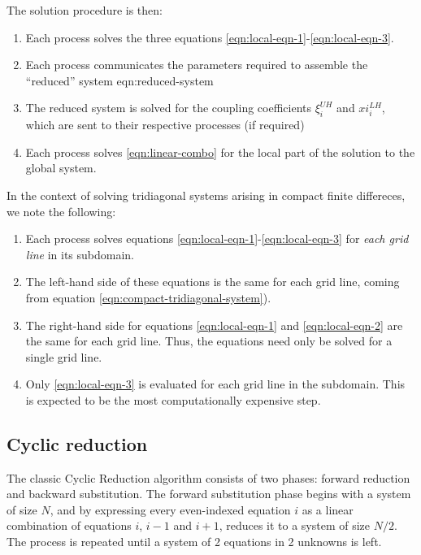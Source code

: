 \documentclass{article}
\begin{document}
    The solution procedure is then:

    \begin{enumerate}
        \item Each process solves the three equations
        \ref{eqn:local-eqn-1}-\ref{eqn:local-eqn-3}.
        \item Each process communicates the parameters required to
        assemble the ``reduced'' system eqn:reduced-system
        \item The reduced system is solved for the coupling coefficients
        $\xi_i^{UH}$ and $xi_i^{LH}$, which are sent to their respective processes
        (if required)
        \item Each process solves \ref{eqn:linear-combo} for the local part
        of the solution to the global system.
    \end{enumerate}

    In the context of solving tridiagonal systems arising in compact finite differeces,
    we note the following:

    \begin{enumerate}
        \item Each process solves equations \ref{eqn:local-eqn-1}-\ref{eqn:local-eqn-3}
            for \emph{each grid line} in its subdomain.
        \item The left-hand side of these equations is the same
            for each grid line, coming from equation \ref{eqn:compact-tridiagonal-system}).
        \item The right-hand side for equations \ref{eqn:local-eqn-1} and
            \ref{eqn:local-eqn-2} are the same for each grid line.
            Thus, the equations need only be solved for a single grid line.
        \item Only \ref{eqn:local-eqn-3} is evaluated for each grid line
            in the subdomain. This is expected to be the most computationally expensive step.
    \end{enumerate}

    \subsection{Cyclic reduction}

        The classic Cyclic Reduction algorithm consists of two phases:
        forward reduction and backward substitution.
        The forward substitution phase begins with a system of size $N$,
        and by expressing every even-indexed equation $i$ as a linear
        combination of equations $i$, $i-1$ and $i+1$, reduces it to a
        system of size $N/2$.
        The process is repeated until a system of 2 equations in 2 unknowns
        is left.
\end{document}
